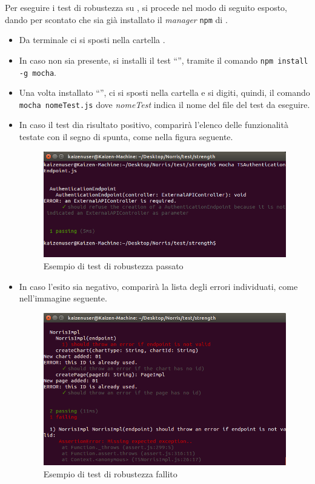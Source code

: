 					Per eseguire i test di robustezza su , si procede nel modo di seguito esposto, dando per scontato che sia già installato il \textit{ manager} \texttt{npm} di .
					\begin{itemize}
						\item Da terminale ci si sposti nella cartella .
						\item In caso non sia presente, si installi il test  “”, tramite il comando \texttt{npm install -g mocha}. 
						\item Una volta installato “”, ci si sposti nella cartella  e si digiti, quindi, il comando \texttt{mocha nomeTest.js} dove \textit{nomeTest} indica il nome del file del test da eseguire.
						\item In caso il test dia risultato positivo, comparirà l'elenco delle funzionalità testate con il segno di spunta, come nella figura seguente.
						\begin{figure}[H]
							\centering
							\includegraphics[scale=0.5]{Pics/TSPassing.png}
							\caption{Esempio di test di robustezza passato}
						\end{figure}
						\item In caso l'esito sia negativo, comparirà la lista degli errori individuati, come nell'immagine seguente.
						\begin{figure}[H]
							\centering
							\includegraphics[scale=0.5]{Pics/TSNotPassing.png}
							\caption{Esempio di test di robustezza fallito}
						\end{figure}
					\end{itemize}
					
